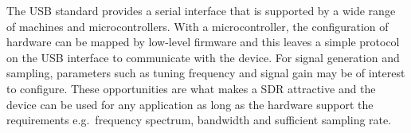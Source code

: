 The \gls{USB} standard provides a serial interface that is supported
by a wide range of machines and microcontrollers. With a
microcontroller, the configuration of hardware can be mapped by
low-level firmware and this leaves a simple protocol on the \gls{USB}
interface to communicate with the device. For signal generation and
sampling, parameters such as tuning frequency and signal gain may be
of interest to configure. These opportunities are what makes a
\gls{SDR} attractive and the device can be used for any application as
long as the hardware support the requirements e.g.\ frequency
spectrum, bandwidth and sufficient sampling rate.
